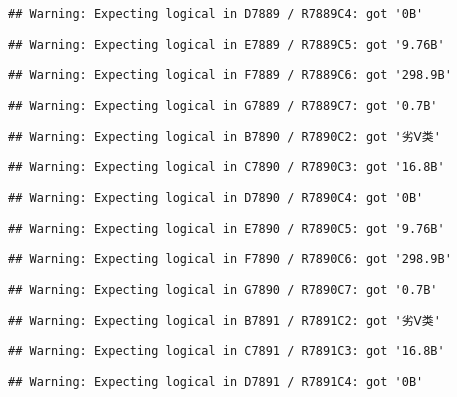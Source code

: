 \documentclass[
]{article}
\begin{document}
\begin{verbatim}
## Warning: Expecting logical in D7889 / R7889C4: got '0B'
\end{verbatim}

\begin{verbatim}
## Warning: Expecting logical in E7889 / R7889C5: got '9.76B'
\end{verbatim}

\begin{verbatim}
## Warning: Expecting logical in F7889 / R7889C6: got '298.9B'
\end{verbatim}

\begin{verbatim}
## Warning: Expecting logical in G7889 / R7889C7: got '0.7B'
\end{verbatim}

\begin{verbatim}
## Warning: Expecting logical in B7890 / R7890C2: got '劣Ⅴ类'
\end{verbatim}

\begin{verbatim}
## Warning: Expecting logical in C7890 / R7890C3: got '16.8B'
\end{verbatim}

\begin{verbatim}
## Warning: Expecting logical in D7890 / R7890C4: got '0B'
\end{verbatim}

\begin{verbatim}
## Warning: Expecting logical in E7890 / R7890C5: got '9.76B'
\end{verbatim}

\begin{verbatim}
## Warning: Expecting logical in F7890 / R7890C6: got '298.9B'
\end{verbatim}

\begin{verbatim}
## Warning: Expecting logical in G7890 / R7890C7: got '0.7B'
\end{verbatim}

\begin{verbatim}
## Warning: Expecting logical in B7891 / R7891C2: got '劣Ⅴ类'
\end{verbatim}

\begin{verbatim}
## Warning: Expecting logical in C7891 / R7891C3: got '16.8B'
\end{verbatim}

\begin{verbatim}
## Warning: Expecting logical in D7891 / R7891C4: got '0B'
\end{verbatim}
\end{document}

